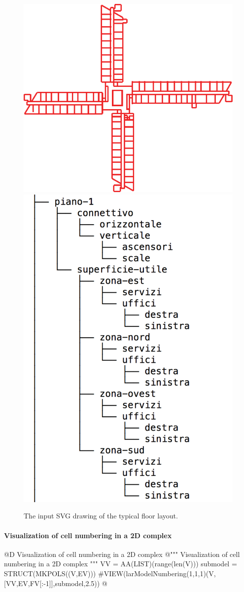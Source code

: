 \documentclass[11pt,oneside]{article}    %
\begin{document}
\begin{figure}[htbp] %
   \centering
   \includegraphics[width=0.55\linewidth]{images/croce} \hfill
   \includegraphics[width=0.35\linewidth]{images/croce2} 
   \caption{The input SVG drawing of the typical floor layout.}
   \label{fig:example}
\end{figure}


\paragraph{Visualization of cell numbering in a 2D complex}
@D Visualization of cell numbering in a 2D complex
@{""" Visualization of cell numbering in a 2D complex """
VV = AA(LIST)(range(len(V)))
submodel = STRUCT(MKPOLS((V,EV)))
#VIEW(larModelNumbering(1,1,1)(V,[VV,EV,FV[:-1]],submodel,2.5))
@}
\end{document}
